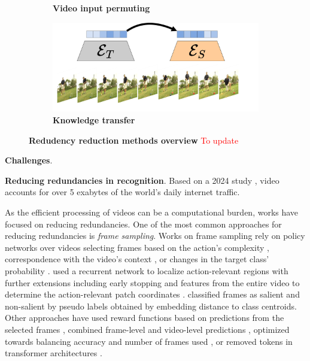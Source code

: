 \documentclass[smallextended,twocolumn,natbib]{svjour3}
\begin{document}
\begin{figure}[t]
\begin{subfigure}[b]{0.49\linewidth}
         \caption{\textbf{Video input permuting}}
         \label{fig:redundancies_reduction::permute}
     \end{subfigure}
     \hfill
     \begin{subfigure}[b]{0.49\linewidth}
         \centering
         \includegraphics[width=\linewidth]{figs/redundancies_reduction/redudancies_transfer.pdf}
         \caption{\textbf{Knowledge transfer}}
         \label{fig:redundancies_reduction::transfer}
     \end{subfigure}
        \caption{\textbf{Redudency reduction methods overview} \textcolor{red}{To update}}
        \label{fig:redundancies_reduction}
\end{figure}

\noindent
\textbf{Challenges}.


\noindent
\textbf{Reducing redundancies in recognition}. Based on a 2024 study \citep{sandvine2024global}, video accounts for over 5 exabytes of the world's daily internet traffic. 

As the efficient processing of videos can be a computational burden, works have focused on reducing redundancies. One of the most common approaches for reducing redundancies is \emph{frame sampling}. Works on frame sampling rely on policy networks over videos selecting frames based on the action's complexity \citep{ghodrati2021frameexit,yeung2016end}, correspondence with the video's context \citep{wu2019adaframe}, or changes in the target class' probability \citep{korbar2019scsampler}. \citet{wang2021adaptive} used a recurrent network to localize action-relevant regions with further extensions including early stopping \citep{wang2022adafocus} and features from the entire video to determine the action-relevant patch coordinates \citep{wang2022adafocusv3}. \citet{xia2022nsnet} classified frames as salient and non-salient by pseudo labels obtained by embedding distance to class centroids. Other approaches have used reward functions based on predictions from the selected frames \citep{wu2020dynamic}, combined frame-level and video-level predictions \citep{gowda2021smart}, optimized towards balancing accuracy and number of frames used \citep{wu2019liteeval}, or removed tokens in transformer architectures \citep{wu2024haltingvt}.
\end{document}
